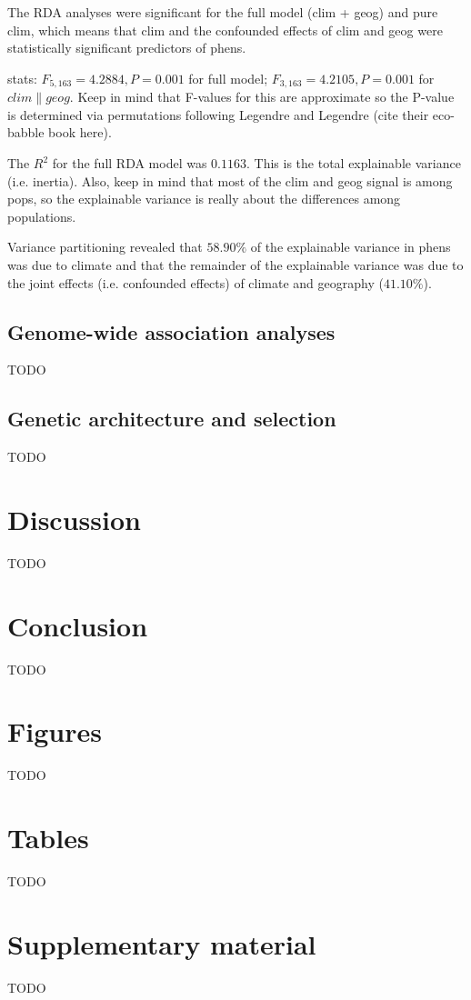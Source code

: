 \documentclass[fleqn,11pt]{wlpeerj}
\begin{document}
The RDA analyses were significant for the full model (clim + geog) and pure clim,
which means that clim and the confounded effects of clim and geog were statistically
significant predictors of phens.

stats: $F_{5,163} = 4.2884, P = 0.001$ for full model; $F_{3,163} = 4.2105, P = 0.001$ for $clim\|geog$.
Keep in mind that F-values for this are approximate so the P-value is determined via permutations
following Legendre and Legendre (cite their eco-babble book here).

The $R^{2}$ for the full RDA model was $0.1163$. This is the total explainable variance (i.e. inertia).
Also, keep in mind that most of the clim and geog signal is among pops, so the
explainable variance is really about the differences among populations.

Variance partitioning revealed that $58.90\%$ of the explainable variance in phens
was due to climate and that the remainder of the explainable variance was due to
the joint effects (i.e. confounded effects) of climate and geography ($41.10\%$).

\subsection*{Genome-wide association analyses}
TODO

\subsection*{Genetic architecture and selection}
TODO

\section*{Discussion}
TODO


\section*{Conclusion}
TODO


\section*{Figures}
TODO

\section*{Tables}
TODO

\section*{Supplementary material}
TODO

\clearpage

\end{document}
